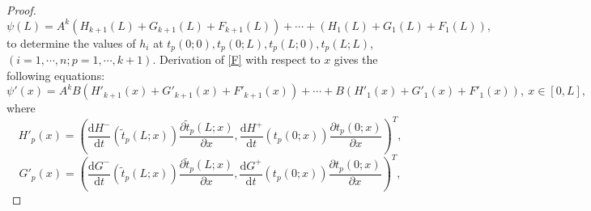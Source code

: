 \documentclass[a4paper,reqno,11pt]{amsart}
\numberwithin{equation}{section} %
\begin{document}
\begin{proof}
\begin{equation}
\end{equation}
\begin{equation}\label{c0 continuity at L}
\psi\left(L \right) =A^k\left( H_{k+1}\left( L \right) +G_{k+1}\left( L \right)+F_{k+1}\left( L \right) \right)+\cdots +\left( H_1\left( L \right) +G_1\left( L \right)+F_1\left( L \right) \right) ,
\end{equation}
to determine the values of $h_i$ at $t_p(0;0),t_p(0;L),t_p(L;0),t_p(L;L)$,$(i=1,\cdots,n; p=1,\cdots,k+1)$.
Derivation of  \eqref{F} with respect to $x$ gives the following equations:
\begin{equation}\label{derivative of psi}
	\psi  '\left( x \right)=A^kB(H'_{k+1}\left( x \right)+G'_{k+1}\left( x \right)+F'_{k+1}\left( x \right)) +\cdots + B(H'_1\left( x \right)+G'_1\left( x \right)+F'_1\left( x \right)) ,\ x\in \left[ 0,L \right],
\end{equation}
where 
$$
H'_{p}\left( x \right) =\left( \frac{\text{d} H^{-}}{ \text{d}t} \left( \tilde{t}_{p}(L;x) \right) \frac{\partial \tilde{t} _{p}(L;x)}{\partial x} ,\frac{\text{d} H^{+}}{\text{d} t}\left( t_{p}(0;x)\right) \frac{\partial t_{p}(0;x)}{\partial x} \right) ^T,
$$
$$
G'_{p}\left( x \right) =\left( \frac{\text{d} G^{-}}{\text{d} t}\left( \tilde{t}_{p}(L;x) \right) \frac{\partial \tilde{t}  _{p}(L;x)}{\partial x} ,\frac{\text{d} G^{+}}{\text{d} t}\left( t_{p}(0;x)\right) \frac{\partial t_{p}(0;x)}{\partial x} \right) ^T,
$$

\end{proof}
\end{document}
